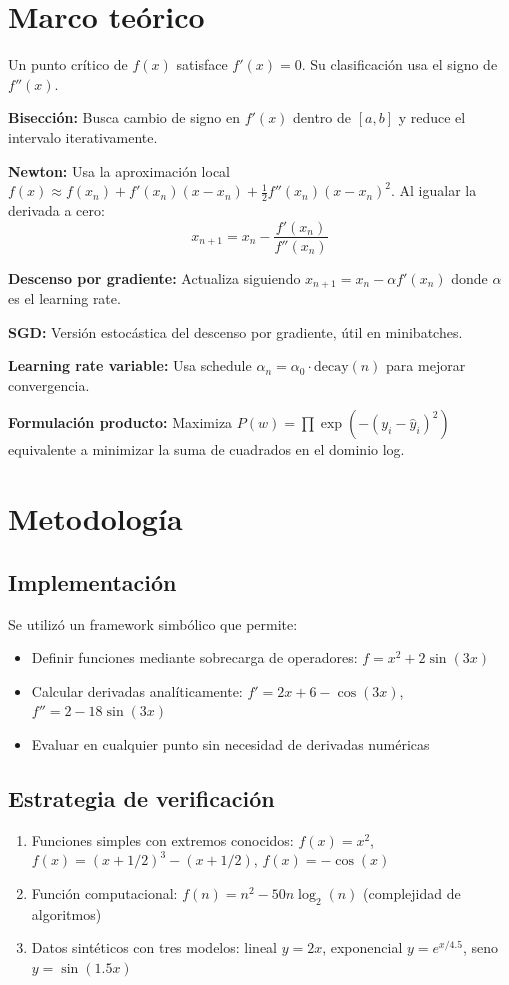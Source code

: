 \documentclass[12pt,a4paper]{article}
\begin{document}
\section{Marco teórico}
Un punto crítico de $f(x)$ satisface $f'(x)=0$. Su clasificación usa el signo de $f''(x)$.

\textbf{Bisección:} Busca cambio de signo en $f'(x)$ dentro de $[a,b]$ y reduce el intervalo iterativamente.

\textbf{Newton:} Usa la aproximación local $f(x) \approx f(x_n) + f'(x_n)(x-x_n) + \frac{1}{2}f''(x_n)(x-x_n)^2$. Al igualar la derivada a cero:
$$x_{n+1} = x_n - \frac{f'(x_n)}{f''(x_n)}$$

\textbf{Descenso por gradiente:} Actualiza siguiendo $x_{n+1} = x_n - \alpha f'(x_n)$ donde $\alpha$ es el learning rate.

\textbf{SGD:} Versión estocástica del descenso por gradiente, útil en minibatches.

\textbf{Learning rate variable:} Usa schedule $\alpha_n = \alpha_0 \cdot \text{decay}(n)$ para mejorar convergencia.

\textbf{Formulación producto:} Maximiza $P(w) = \prod \exp(-(y_i - \hat{y}_i)^2)$ equivalente a minimizar la suma de cuadrados en el dominio log.

\section{Metodología}
\subsection{Implementación}
Se utilizó un framework simbólico que permite:
\begin{itemize}
    \item Definir funciones mediante sobrecarga de operadores: $f = x^2 + 2\sin(3x)$
    \item Calcular derivadas analíticamente: $f' = 2x + 6-\cos(3x)$, $f'' = 2 - 18\sin(3x)$
    \item Evaluar en cualquier punto sin necesidad de derivadas numéricas
\end{itemize}

\subsection{Estrategia de verificación}
\begin{enumerate}
    \item Funciones simples con extremos conocidos: $f(x)=x^2$, $f(x)=(x+1/2)^3-(x+1/2)$, $f(x)=-\cos(x)$
    \item Función computacional: $f(n)=n^2-50n\log_2(n)$ (complejidad de algoritmos)
    \item Datos sintéticos con tres modelos: lineal $y=2x$, exponencial $y=e^{x/4.5}$, seno $y=\sin(1.5x)$
\end{enumerate}
\end{document}
